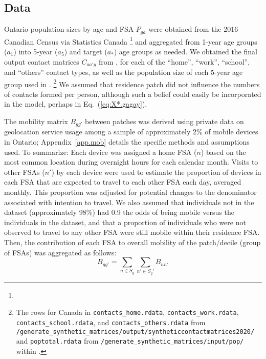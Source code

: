 \subsection{Data}\label{ex:data}
Ontario population sizes by age and FSA $P_{ga}$ were obtained from
the 2016 Canadian Census via Statistics Canada%
\footnote{}
and aggregated from 1-year age groups ($a_1$) into 5-year ($a_5$) and target ($a_*$) age groups as needed.
We obtained the final output contact matrices $C_{aa'y}$ from \cite{Prem2017},
for each of the ``home'', ``work'', ``school'', and ``others'' contact types,
as well as the population size of each 5-year age group used in \cite{Prem2017}.%
\footnote{\raggedright
  The rows for Canada in
  \texttt{contacts\_home.rdata},
  \texttt{contacts\_work.rdata}, 
  \texttt{contacts\_school.rdata}, and 
  \texttt{contacts\_others.rdata}
  from \texttt{/generate\_synthetic\_matrices/output/syntheticcontactmatrices2020/} and
  \texttt{poptotal.rdata}
  from \texttt{/generate\_synthetic\_matrices/input/pop/}
  within .}
We assumed that residence patch did not influence the numbers of contacts formed per person,
although such a belief could easily be incorporated in the model,
perhaps in Eq.~(\ref{eq:X*.gagay}).
\par
The mobility matrix $B_{gg'}$ between patches was derived using
private data on geolocation service usage among a sample of approximately 2\% of mobile devices in Ontario;
Appendix~\ref{app.mob} details the specific methods and assumptions used.
To summarize:
Each device was assigned a home FSA ($n$) based on
the most common location during overnight hours for each calendar month.
Visits to other FSAs ($n'$) by each device were used to estimate
the proportion of devices in each FSA that are expected to travel to each other FSA each day, averaged monthly.
This proportion was adjusted for potential changes to the denominator associated with intention to travel.
We also assumed that individuals not in the dataset (approximately 98\%) had
0.9 the odds of being mobile versus the individuals in the dataset,
and that a proportion of individuals who were not observed to travel to any other FSA
were still mobile within their residence FSA.
Then, the contribution of each FSA to overall mobility of the patch/decile (group of FSAs)
was aggregated as follows:
\begin{equation}\label{eq:Bgg}
  B_{gg'} = \sum_{n \in S_g}\sum_{n' \in S_g'} B_{nn'}
\end{equation}
